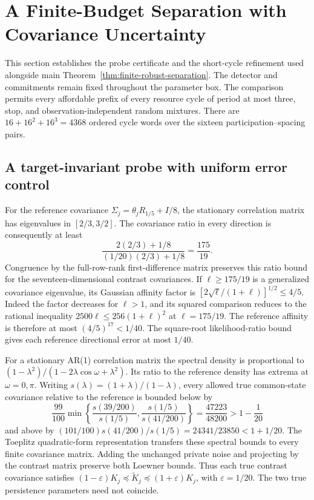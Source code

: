\section{A Finite-Budget Separation with Covariance Uncertainty}
\label{sec:finite-robust}
This section establishes the probe certificate and the short-cycle refinement used alongside main Theorem~\ref{thm:finite-robust-separation}.
The detector and commitments remain fixed throughout the parameter box.
The comparison permits every affordable prefix of every resource cycle of period at most three, stop, and observation-independent random mixtures.
There are $16+16^2+16^3=4368$ ordered cycle words over the sixteen participation--spacing pairs.

\subsection{A target-invariant probe with uniform error control}
For the reference covariance $\Sigma_j=\theta_jR_{1/5}+I/8$, the stationary correlation matrix has eigenvalues in $[2/3,3/2]$.
The covariance ratio in every direction is consequently at least
\[
\frac{2(2/3)+1/8}{(1/20)(2/3)+1/8}=\frac{175}{19}.
\]
Congruence by the full-row-rank first-difference matrix preserves this ratio bound for the seventeen-dimensional contrast covariances.
If $\ell\ge175/19$ is a generalized covariance eigenvalue, its Gaussian affinity factor is $[2\sqrt\ell/(1+\ell)]^{1/2}\le4/5$.
Indeed the factor decreases for $\ell>1$, and its squared comparison reduces to the rational inequality $2500\ell\le256(1+\ell)^2$ at $\ell=175/19$.
The reference affinity is therefore at most $(4/5)^{17}<1/40$.
The square-root likelihood-ratio bound gives each reference directional error at most $1/40$.

For a stationary AR(1) correlation matrix the spectral density is proportional to $(1-\lambda^2)/(1-2\lambda\cos\omega+\lambda^2)$.
Its ratio to the reference density has extrema at $\omega=0,\pi$.
Writing $s(\lambda)=(1+\lambda)/(1-\lambda)$, every allowed true common-state covariance relative to the reference is bounded below by
\[
\frac{99}{100}\min\left\{\frac{s(39/200)}{s(1/5)},\frac{s(1/5)}{s(41/200)}\right\}
=\frac{47223}{48200}>1-\frac1{20}
\]
and above by $(101/100)s(41/200)/s(1/5)=24341/23850<1+1/20$.
The Toeplitz quadratic-form representation transfers these spectral bounds to every finite covariance matrix.
Adding the unchanged private noise and projecting by the contrast matrix preserve both Loewner bounds.
Thus each true contrast covariance satisfies $(1-\varepsilon)K_j\preceq\widetilde K_j\preceq(1+\varepsilon)K_j$, with $\varepsilon=1/20$.
The two true persistence parameters need not coincide.

